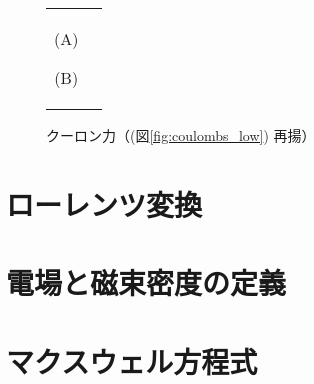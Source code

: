         \begin{figure}[hbt]
            \begin{tabular}{cc}
                \begin{minipage}{0.5\hsize}
                    \begin{center}
                        {coulombs_low1.pdf}

                        (A)
                    \end{center}
                \end{minipage}
                \begin{minipage}{0.5\hsize}
                    \begin{center}
                        {coulombs_low2.pdf}

                        (B)
                    \end{center}
                \end{minipage}
            \end{tabular}
                        \caption{クーロン力（(図\ref{fig:coulombs_low}) 再揚）}
        \end{figure}


    \section{ローレンツ変換}

    \section{電場と磁束密度の定義}

    \section{マクスウェル方程式}

